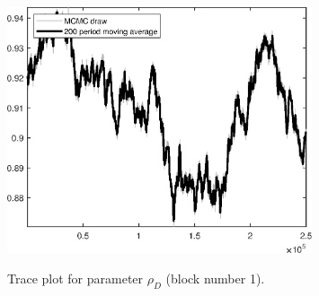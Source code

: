 \begin{figure}[H]
\centering
  \includegraphics[width=0.8\textwidth]{BRS_imp_mobility_alt/graphs/TracePlot_rho_D_blck_1}\\
    \caption{Trace plot for parameter ${\rho_D}$ (block number 1).}
\end{figure}
